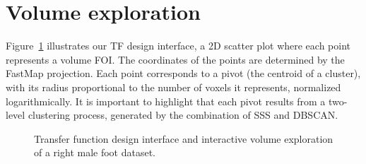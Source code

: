\section{Volume exploration}
\label{sect:volume-exploration}

Figure~\ref{fig:tf-design-example} illustrates our TF design interface, a 2D scatter plot where each point represents a volume FOI. The coordinates of the points are determined by the FastMap projection. Each point corresponds to a pivot (the centroid of a cluster), with its radius proportional to the number of voxels it represents, normalized logarithmically. It is important to highlight that each pivot results from a two-level clustering process, generated by the combination of SSS and DBSCAN.

\begin{figure}[htb!]
    \centering
    \hfill
    \caption{Transfer function design interface and interactive volume exploration of a right male foot dataset.}
    \label{fig:tf-design-example}
\end{figure}

